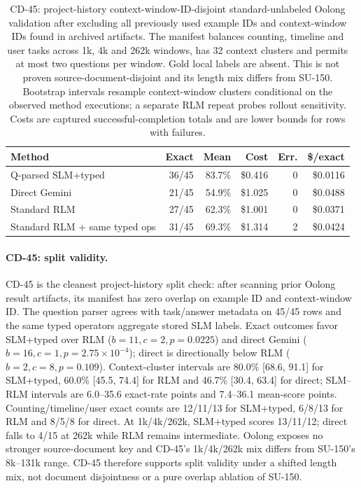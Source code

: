 \documentclass[letterpaper]{article}
\begin{document}
\begin{table}[!t]
\centering
\small
\setlength{\tabcolsep}{3pt}
\begin{tabular}{@{}lrrrrr@{}}
\toprule
\textbf{Method} & \textbf{Exact} & \textbf{Mean} & \textbf{Cost} & \textbf{Err.} & \textbf{\$/exact} \\
\midrule
Q-parsed SLM+typed & 36/45 & 83.7\% & \$0.416 & 0 & \$0.0116 \\
Direct Gemini & 21/45 & 54.9\% & \$1.025 & 0 & \$0.0488 \\
Standard RLM & 27/45 & 62.3\% & \$1.001 & 0 & \$0.0371 \\
Standard RLM + same typed ops & 31/45 & 69.3\% & \$1.314 & 2 & \$0.0424 \\
\bottomrule
\end{tabular}
\caption{CD-45: project-history context-window-ID-disjoint standard-unlabeled Oolong validation after excluding all previously used example IDs and context-window IDs found in archived artifacts. The manifest balances counting, timeline and user tasks across 1k, 4k and 262k windows, has 32 context clusters and permits at most two questions per window. Gold local labels are absent. This is not proven source-document-disjoint and its length mix differs from SU-150. Bootstrap intervals resample context-window clusters conditional on the observed method executions; a separate RLM repeat probes rollout sensitivity. Costs are captured successful-completion totals and are lower bounds for rows with failures.}
\label{tab:supp-oolong-context-disjoint-n45}
\end{table}

\paragraph{CD-45: split validity.}
CD-45 is the cleanest project-history split check: after scanning prior Oolong result artifacts, its manifest has zero overlap on example ID and context-window ID. The question parser agrees with task/answer metadata on 45/45 rows and the same typed operators aggregate stored SLM labels. Exact outcomes favor SLM+typed over RLM ($b=11,c=2,p=0.0225$) and direct Gemini ($b=16,c=1,p=2.75\times10^{-4}$); direct is directionally below RLM ($b=2,c=8,p=0.109$). Context-cluster intervals are 80.0\% [68.6, 91.1] for SLM+typed, 60.0\% [45.5, 74.4] for RLM and 46.7\% [30.4, 63.4] for direct; SLM--RLM intervals are 6.0--35.6 exact-rate points and 7.4--36.1 mean-score points. Counting/timeline/user exact counts are 12/11/13 for SLM+typed, 6/8/13 for RLM and 8/5/8 for direct. At 1k/4k/262k, SLM+typed scores 13/11/12; direct falls to 4/15 at 262k while RLM remains intermediate. Oolong exposes no stronger source-document key and CD-45's 1k/4k/262k mix differs from SU-150's 8k--131k range. CD-45 therefore supports split validity under a shifted length mix, not document disjointness or a pure overlap ablation of SU-150.
\end{document}

